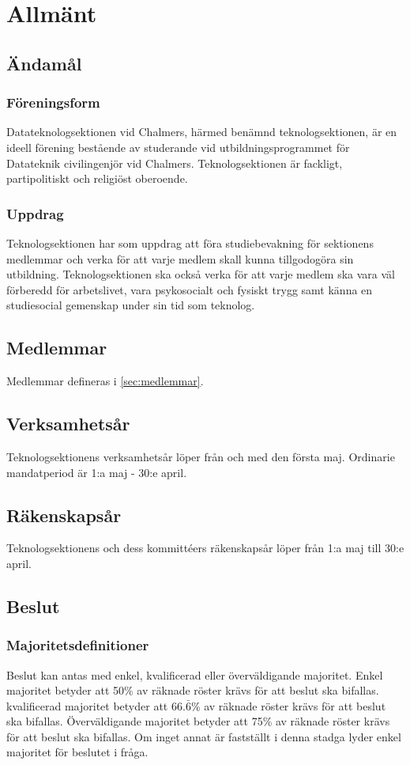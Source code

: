 \section{Allmänt}
\subsection{Ändamål}
\subsubsection{Föreningsform}
Datateknologsektionen vid Chalmers, härmed benämnd teknologsektionen, är en ideell förening bestående av studerande vid utbildningsprogrammet för Datateknik civilingenjör vid Chalmers.
Teknologsektionen är fackligt, partipolitiskt och religiöst oberoende.
\subsubsection{Uppdrag}
Teknologsektionen har som uppdrag att föra studiebevakning för sektionens medlemmar och verka för att varje medlem skall kunna tillgodogöra sin utbildning.
Teknologsektionen ska också verka för att varje medlem ska vara väl förberedd för arbetslivet, vara psykosocialt och fysiskt trygg samt känna en studiesocial gemenskap under sin tid som teknolog.
\subsection{Medlemmar}
Medlemmar defineras i \ref{sec:medlemmar}.
\subsection{Verksamhetsår}
Teknologsektionens verksamhetsår löper från och med den första maj. Ordinarie mandatperiod är 1:a maj - 30:e april.
\subsection{Räkenskapsår}
Teknologsektionens och dess kommittéers räkenskapsår löper från 1:a maj till 30:e april.
\subsection{Beslut}
\label{sec:beslut}
\subsubsection{Majoritetsdefinitioner}
Beslut kan antas med enkel, kvalificerad eller överväldigande majoritet.
Enkel majoritet betyder att 50\% av räknade röster krävs för att beslut ska bifallas.
kvalificerad majoritet betyder att $66.\bar{6}$\% av räknade röster krävs för att beslut ska bifallas.
Överväldigande majoritet betyder att 75\% av räknade röster krävs för att beslut ska bifallas.
Om inget annat är fastställt i denna stadga lyder enkel majoritet för beslutet i fråga.
